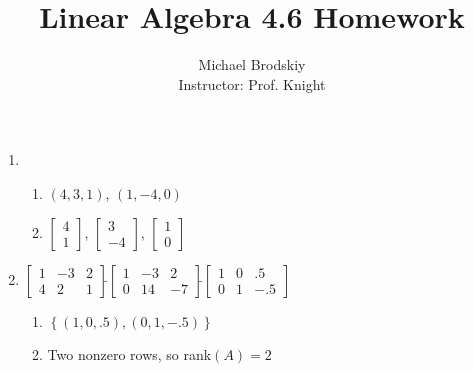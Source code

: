 \documentclass[12pt]{article}
\title{Linear Algebra 4.6 Homework}
\date{}
\author{Michael Brodskiy\\ \small Instructor: Prof. Knight}
\begin{document}
\maketitle

\begin{enumerate}

    \begin{center}
    \underline{Problems 3, 7, 9, 11$^*$, 17$^*$, 23, 29, 35, 39, 41, 47}
    \end{center}

    \setcounter{enumi}{2}

  \item

    \begin{enumerate}

      \item $(4,3,1)$, $(1,-4,0)$

      \item $\begin{bmatrix} 4\\1  \end{bmatrix}$, $\begin{bmatrix} 3\\-4  \end{bmatrix}$, $\begin{bmatrix} 1\\0  \end{bmatrix}$

    \end{enumerate}

    \setcounter{enumi}{6}

  \item $\begin{bmatrix} 1 & -3 & 2\\ 4 & 2 & 1  \end{bmatrix}\widetilde{   }\begin{bmatrix} 1 & -3 & 2\\ 0 & 14 & -7  \end{bmatrix}\widetilde{   }\begin{bmatrix} 1 & 0 & .5\\ 0 & 1 & -.5\end{bmatrix}$

    \begin{enumerate}

      \item $\left\{ (1, 0, .5), (0, 1, -.5) \right\}$

      \item Two nonzero rows, so rank$(A)=2$


\end{enumerate}
\end{enumerate}
\end{document}

